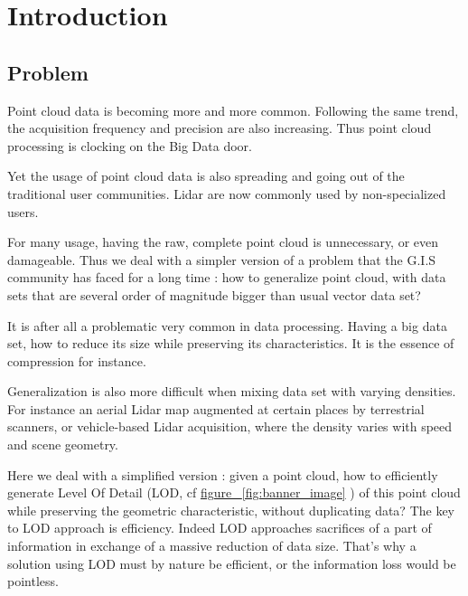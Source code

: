 

\section{Introduction}
	\subsection{Problem} 
	 
		Point cloud data is becoming more and more common. Following the same trend, the acquisition frequency and precision are also increasing.
		Thus point cloud processing is clocking on the Big Data door.
		
		Yet the usage of point cloud data is also spreading and going out of the traditional user communities. 
		Lidar are now commonly used by non-specialized users. 
		
		
		For many usage, having the raw, complete point cloud is unnecessary, or even damageable.
		Thus we deal with a simpler version of a problem that the G.I.S community has faced for a long time : how to generalize point cloud, with data sets that are several order of magnitude bigger than usual vector data set?
		
		It is after all a problematic very common in data processing. Having a big data set, how to reduce its size while preserving its characteristics.
		It is the essence of compression for instance.
		
		Generalization is also more difficult when mixing data set with varying densities. For instance an aerial Lidar map augmented at certain places by terrestrial scanners, or vehicle-based Lidar acquisition, where the density varies with speed and scene geometry.
		
		Here we deal with a simplified version : given a point cloud, how to efficiently generate Level Of Detail (LOD, cf \href{banner_image}{figure ~\ref{fig:banner_image}} ) of this point cloud while preserving the geometric characteristic, without duplicating data?
		The key to LOD approach is efficiency. Indeed LOD approaches sacrifices of a part of information in exchange of a massive reduction of data size. That's why a solution using LOD must by nature be efficient, or the information loss would be pointless.
		
